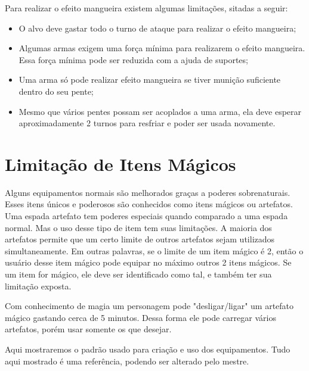 Para realizar o efeito mangueira existem algumas limitações, sitadas a seguir:

\begin{itemize}
	\item O alvo deve gastar todo o turno de ataque para realizar o efeito  mangueira;

	\item Algumas armas exigem uma força mínima para realizarem o efeito mangueira. Essa força mínima pode ser reduzida com a ajuda de suportes;

	\item Uma arma só pode realizar efeito mangueira se tiver munição suficiente dentro do seu pente;

	\item Mesmo que vários pentes possam ser acoplados a uma arma, ela deve esperar aproximadamente 2 turnos para resfriar e poder ser usada novamente.

\end{itemize}


\section{Limitação de Itens Mágicos}

Alguns equipamentos normais são melhorados graças a poderes sobrenaturais. Esses itens únicos e poderosos são conhecidos como itens mágicos ou artefatos. Uma espada artefato tem poderes especiais quando comparado a uma espada normal. Mas o uso desse tipo de item tem suas limitações. A maioria dos artefatos permite que um certo limite de outros artefatos sejam utilizados simultaneamente. Em outras palavras, se o limite de um item mágico é 2, então o usuário desse item mágico pode equipar no máximo outros 2 itens mágicos. Se um item for mágico, ele deve ser identificado como tal, e também ter sua limitação exposta.

Com conhecimento de magia um personagem pode "desligar/ligar" um artefato mágico gastando cerca de 5 minutos. Dessa forma ele pode carregar vários artefatos, porém usar somente os que desejar. 


Aqui mostraremos o padrão usado para criação e uso dos equipamentos. Tudo aqui mostrado é uma referência, podendo ser alterado pelo mestre.

